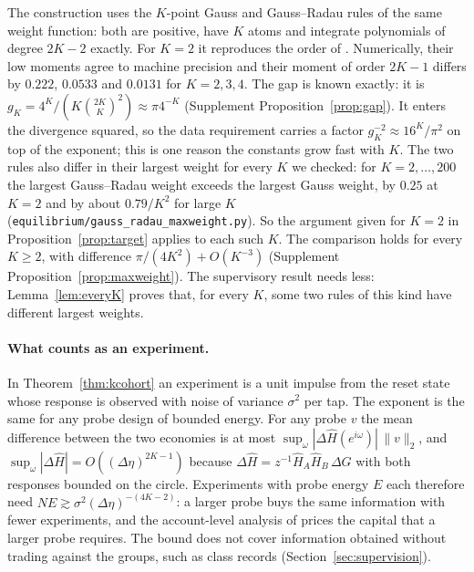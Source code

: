 \documentclass[12pt]{article}
\theoremstyle{definition}
\theoremstyle{remark}
\begin{document}
The construction uses the $K$-point Gauss and Gauss--Radau rules of the same weight function: both are positive, have $K$ atoms and integrate polynomials of degree $2K-2$ exactly. For $K=2$ it reproduces the order of \citet[Theorem~S11.1]{niroula2026full}. Numerically, their low moments agree to machine precision and their moment of order $2K-1$ differs by $0.222$, $0.0533$ and $0.0131$ for $K=2,3,4$. The gap is known exactly: it is $g_K=4^K/(K\binom{2K}{K}^2)\approx\pi4^{-K}$ (Supplement Proposition~\ref{prop:gap}). It enters the divergence squared, so the data requirement carries a factor $g_K^{-2}\approx16^K/\pi^2$ on top of the exponent; this is one reason the constants grow fast with $K$. The two rules also differ in their largest weight for every $K$ we checked: for $K=2,\ldots,200$ the largest Gauss--Radau weight exceeds the largest Gauss weight, by $0.25$ at $K=2$ and by about $0.79/K^2$ for large $K$ (\nolinkurl{equilibrium/gauss_radau_maxweight.py}). So the argument given for $K=2$ in Proposition~\ref{prop:target} applies to each such $K$. The comparison holds for every $K\ge2$, with difference $\pi/(4K^2)+O(K^{-3})$ (Supplement Proposition~\ref{prop:maxweight}). The supervisory result needs less: Lemma~\ref{lem:everyK} proves that, for every $K$, some two rules of this kind have different largest weights.

\paragraph{What counts as an experiment.} In Theorem~\ref{thm:kcohort} an experiment is a unit impulse from the reset state whose response is observed with noise of variance $\sigma^2$ per tap. The exponent is the same for any probe design of bounded energy. For any probe $v$ the mean difference between the two economies is at most $\sup_\omega|\Delta\hat H(e^{i\omega})|\,\|v\|_2$, and $\sup_\omega|\Delta\hat H|=O((\Delta\eta)^{2K-1})$ because $\Delta\hat H=z^{-1}\hat H_A\hat H_B\,\Delta G$ with both responses bounded on the circle. Experiments with probe energy $E$ each therefore need $NE\gtrsim\sigma^2(\Delta\eta)^{-(4K-2)}$: a larger probe buys the same information with fewer experiments, and the account-level analysis of \citet{niroula2026a} prices the capital that a larger probe requires. The bound does not cover information obtained without trading against the groups, such as class records (Section~\ref{sec:supervision}).
\end{document}
